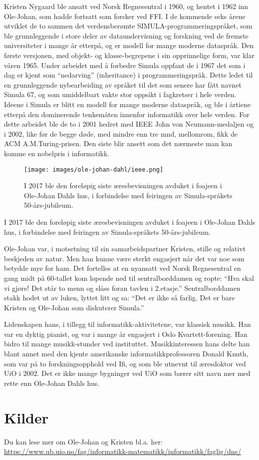 Kristen Nygaard ble ansatt ved Norsk Regnesentral i 1960, og hentet i 1962 inn Ole-Johan, som hadde fortsatt som forsker ved FFI. I de kommende seks årene utviklet de to sammen det verdensberømte SIMULA-programmeringspråket, som ble grunnleggende i store deler av dataundervisning og forskning ved de fremste universiteter i mange år etterpå, og er modell for mange moderne dataspråk. Den første versjonen, med objekt- og klasse-begrepene i sin opprinnelige form, var klar våren 1965. Under arbeidet med å forbedre Simula oppfant de i 1967 det som i dag er kjent som ``nedarving'' (inheritance) i programmeringspråk. Dette ledet til en grunnleggende nybearbeiding av språket til det som senere har fått navnet Simula 67, og som umiddelbart vakte stor oppsikt i fagkretser i hele verden. Ideene i Simula er blitt en modell for mange moderne dataspråk, og ble i årtiene etterpå den dominerende tenkemåten innenfor informatikk over hele verden. For dette arbeidet ble de to i 2001 hedret med IEEE John von Neumann-medaljen og i 2002, like før de begge døde, med mindre enn tre mnd, mellomrom, fikk de ACM A.M.Turing-prisen. Den siste blir ansett som det nærmeste man kan komme en nobelpris i informatikk.

\begin{figure}
	\texttt{[image: images/ole-johan-dahl/ieee.png]}
	\label{fig:ieee}
	\caption{I 2017 ble den foreløpig siste æresbevisningen avduket i foajeen i Ole-Johan Dahls hus, i forbindelse med feiringen av Simula-språkets 50-års-jubileum.}
\end{figure}

I 2017 ble den foreløpig siste æresbevisningen avduket i foajeen i Ole-Johan Dahls hus, i forbindelse med feiringen av Simula-språkets 50-års-jubileum.

Ole-Johan var, i motsetning til sin samarbeidspartner Kristen, stille og relativt beskjeden av natur. Men han kunne være sterkt engasjert når det var noe som betydde mye for ham. Det fortelles at en nyansatt ved Norsk Regnesentral en gang midt på 60-tallet kom løpende ned til sentralborddamen og ropte: ``Hva skal vi gjøre! Det står to menn og slåss foran tavlen i 2.etasje.'' Sentralborddamen stakk hodet ut av luken, lyttet litt og sa: ``Det er ikke så farlig. Det er bare Kristen og Ole-Johan som diskuterer Simula.''

Lidenskapen hans, i tillegg til informatikk-aktivitetene, var klassisk musikk. Han var en dyktig pianist, og var i mange år engasjert i Oslo Kvartett-forening. Han bidro til mange musikk-stunder ved instituttet. Musikkinteressen hans delte han blant annet med den kjente amerikanske informatikkprofessoren Donald Knuth, som var på to forskningsopphold ved Ifi, og som ble utnevnt til æresdoktor ved UiO i 2002.
Det er ikke mange bygninger ved UiO som bærer sitt navn mer med rette enn Ole-Johan Dahls hus.

\section*{Kilder}

Du kan lese mer om Ole-Johan og Kristen bl.a. her: \url{https://www.ub.uio.no/fag/informatikk-matematikk/informatikk/faglig/dns/}
